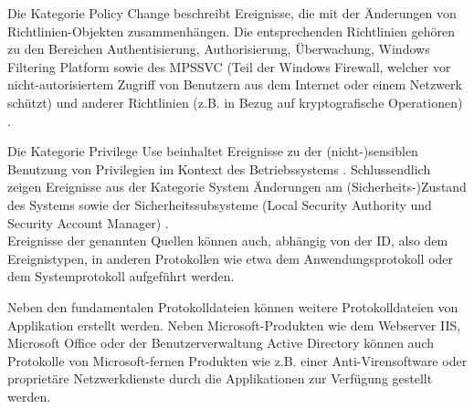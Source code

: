 Die Kategorie \glqq Policy Change\grqq{} beschreibt Ereignisse, die mit der Änderungen von Richtlinien-Objekten zusammenhängen. Die entsprechenden Richtlinien gehören zu den Bereichen Authentisierung, Authorisierung, Überwachung, Windows Filtering Platform sowie des MPSSVC (Teil der Windows Firewall, welcher vor nicht-autorisiertem Zugriff von Benutzern aus dem Internet oder einem Netzwerk schützt) und anderer Richtlinien (z.B. in Bezug auf kryptografische Operationen) \citep{MS5}. %

Die Kategorie \glqq Privilege Use\grqq{}  beinhaltet Ereignisse zu der (nicht-)sensiblen Benutzung von Privilegien im Kontext des Betriebssystems \citep{MS3}. 
Schlussendlich zeigen Ereignisse aus der Kategorie \glqq System\grqq{}  Änderungen am (Sicherheits-)Zustand des Systems sowie der Sicherheitssubsysteme (Local Security Authority und Security Account Manager) \citep{MS3}. \\

Ereignisse der genannten Quellen können auch, abhängig von der ID, also dem Ereignistypen, in anderen Protokollen wie etwa dem Anwendungsprotokoll oder dem Systemprotokoll aufgeführt werden.

Neben den fundamentalen Protokolldateien können weitere Protokolldateien von Applikation erstellt werden. Neben Microsoft-Produkten wie dem Webserver IIS, Microsoft Office oder der Benutzerverwaltung Active Directory können auch Protokolle von Microsoft-fernen Produkten wie z.B. einer Anti-Virensoftware oder proprietäre Netzwerkdienste durch die Applikationen zur Verfügung gestellt werden.

